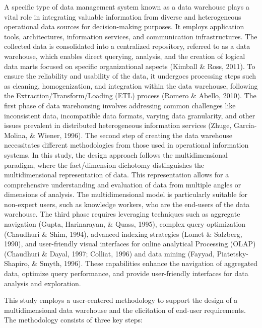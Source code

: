 \documentclass[
11pt, %
oneside, %
english, %
singlespacing, %
]{macthesis} %
\begin{document}
A specific type of data management system known as a data warehouse plays a vital role in integrating valuable information from diverse and heterogeneous operational data sources for decision-making purposes. It employs application tools, architectures, information services, and communication infrastructures. The collected data is consolidated into a centralized repository, referred to as a data warehouse, which enables direct querying, analysis, and the creation of logical data marts focused on specific organizational aspects (Kimball \& Ross, 2011). To ensure the reliability and usability of the data, it undergoes processing steps such as cleaning, homogenization, and integration within the data warehouse, following the Extraction/Transform/Loading (ETL) process (Romero \& Abello, 2010). The first phase of data warehousing involves addressing common challenges like inconsistent data, incompatible data formats, varying data granularity, and other issues prevalent in distributed heterogeneous information services (Zhuge, Garcia-Molina, \& Wiener, 1996). The second step of creating the data warehouse necessitates different methodologies from those used in operational information systems. In this study, the design approach follows the multidimensional paradigm, where the fact/dimension dichotomy distinguishes the multidimensional representation of data. This representation allows for a comprehensive understanding and evaluation of data from multiple angles or dimensions of analysis. The multidimensional model is particularly suitable for non-expert users, such as knowledge workers, who are the end-users of the data warehouse. The third phase requires leveraging techniques such as aggregate navigation (Gupta, Harinarayan, \& Quass, 1995), complex query optimization (Chaudhuri \& Shim, 1994), advanced indexing strategies (Lomet \& Salzberg, 1990), and user-friendly visual interfaces for online analytical Processing (OLAP) (Chaudhuri \& Dayal, 1997; Colliat, 1996) and data mining (Fayyad, Piatetsky-Shapiro, \& Smyth, 1996). These capabilities enhance the navigation of aggregated data, optimize query performance, and provide user-friendly interfaces for data analysis and exploration.

This study employs a user-centered methodology to support the design of a multidimensional data warehouse and the elicitation of end-user requirements. The methodology consists of three key steps:
\end{document}
